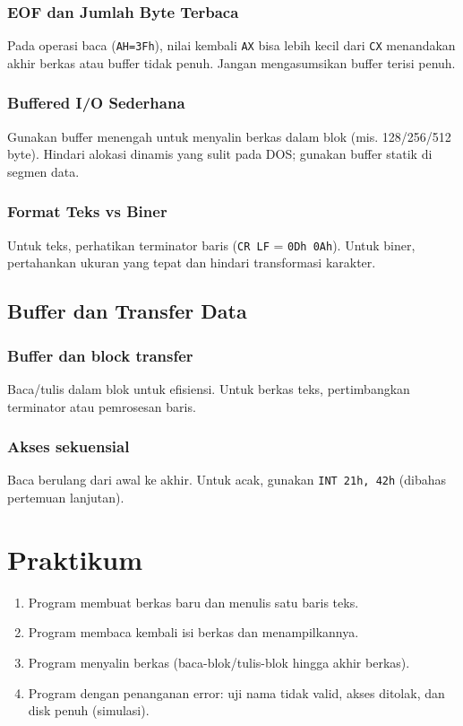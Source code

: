 \subsubsection{EOF dan Jumlah Byte Terbaca}
Pada operasi baca (\texttt{AH=3Fh}), nilai kembali \texttt{AX} bisa lebih kecil dari \texttt{CX} menandakan akhir berkas atau buffer tidak penuh. Jangan mengasumsikan buffer terisi penuh. \cite{rbil}

\subsubsection{Buffered I/O Sederhana}
Gunakan buffer menengah untuk menyalin berkas dalam blok (mis. 128/256/512 byte). Hindari alokasi dinamis yang sulit pada DOS; gunakan buffer statik di segmen data. \cite{osdev_wiki}

\subsubsection{Format Teks vs Biner}
Untuk teks, perhatikan terminator baris (\texttt{CR LF} = \texttt{0Dh 0Ah}). Untuk biner, pertahankan ukuran yang tepat dan hindari transformasi karakter. \cite{osdev_wiki}


\subsection{Buffer dan Transfer Data}
\subsubsection{Buffer dan block transfer}
Baca/tulis dalam blok untuk efisiensi. Untuk berkas teks, pertimbangkan terminator atau pemrosesan baris.

\subsubsection{Akses sekuensial}
Baca berulang dari awal ke akhir. Untuk acak, gunakan \texttt{INT 21h, 42h} (dibahas pertemuan lanjutan).

\section{Praktikum}
\begin{enumerate}
  \item Program membuat berkas baru dan menulis satu baris teks.
  \item Program membaca kembali isi berkas dan menampilkannya.
  \item Program menyalin berkas (baca-blok/tulis-blok hingga akhir berkas).
  \item Program dengan penanganan error: uji nama tidak valid, akses ditolak, dan disk penuh (simulasi).
\end{enumerate}

